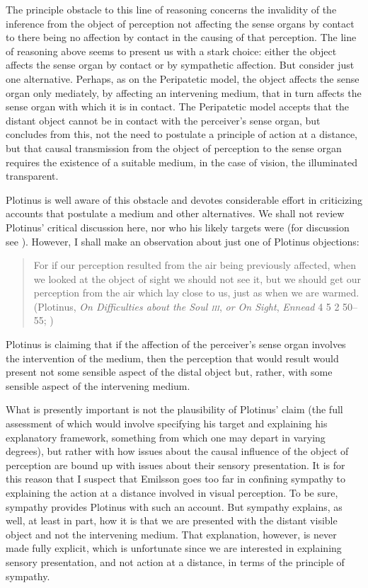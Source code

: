 The principle obstacle to this line of reasoning concerns the invalidity of the inference from the object of perception not affecting the sense organs by contact to there being no affection by contact in the causing of that perception. The line of reasoning above seems to present us with a stark choice: either the object affects the sense organ by contact or by sympathetic affection. But consider just one alternative. Perhaps, as on the Peripatetic model, the object affects the sense organ only mediately, by affecting an intervening medium, that in turn affects the sense organ with which it is in contact. The Peripatetic model accepts that the distant object cannot be in contact with the perceiver's sense organ, but concludes from this, not the need to postulate a principle of action at a distance, but that causal transmission from the object of perception to the sense organ requires the existence of a suitable medium, in the case of vision, the illuminated transparent.

Plotinus is well aware of this obstacle and devotes considerable effort in criticizing accounts that postulate a medium and other alternatives. We shall not review Plotinus' critical discussion here, nor who his likely targets were (for discussion see \citealt[chapter 3.1]{Emilsson:1988uq}). However, I shall make an observation about just one of Plotinus objections:
\begin{quote}
	For if our perception resulted from the air being previously affected, when we looked at the object of sight we should not see it, but we should get our perception from the air which lay close to us, just as when we are warmed. (Plotinus, \emph{On Difficulties about the Soul \textsc{iii}}, \emph{or On Sight}, \emph{Ennead} 4 5 2 50--55; \citealt[289]{Armstrong:1984aa})
\end{quote}
Plotinus is claiming that if the affection of the perceiver's sense organ involves the intervention of the medium, then the perception that would result would present not some sensible aspect of the distal object but, rather, with some sensible aspect of the intervening medium. 

What is presently important is not the plausibility of Plotinus' claim (the full assessment of which would involve specifying his target and explaining his explanatory framework, something from which one may depart in varying degrees), but rather with how issues about the causal influence of the object of perception are bound up with issues about their sensory presentation. It is for this reason that I suspect that Emilsson goes too far in confining sympathy to explaining the action at a distance involved in visual perception. To be sure, sympathy provides Plotinus with such an account. But sympathy explains, as well, at least in part, how it is that we are presented with the distant visible object and not the intervening medium. That explanation, however, is never made fully explicit, which is unfortunate since we are interested in explaining sensory presentation, and not action at a distance, in terms of the principle of sympathy.

